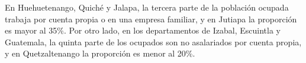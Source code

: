 En Huehuetenango, Quiché y Jalapa, la tercera parte de la población ocupada trabaja por cuenta propia o en una empresa familiar, y en Jutiapa la proporción es mayor al 35\%. Por otro lado, en los departamentos de Izabal, Escuintla y Guatemala, la quinta parte de los ocupados son no asalariados por cuenta propia, y en Quetzaltenango la proporción es menor al 20\%.